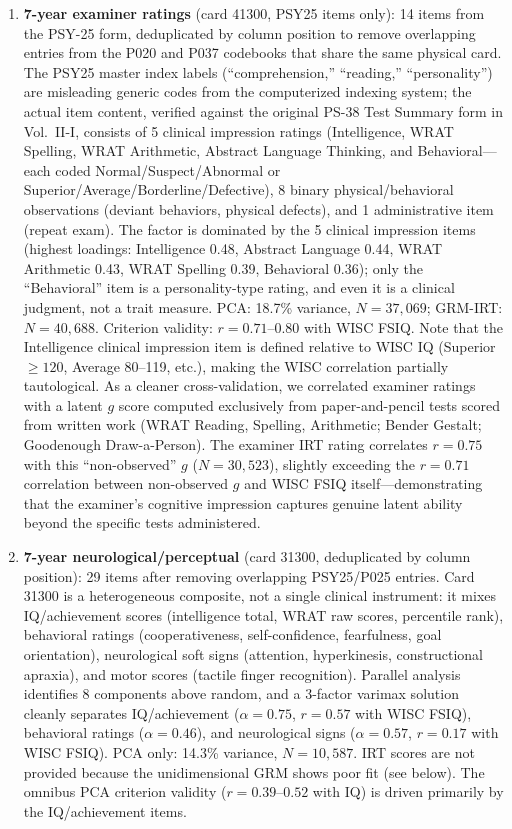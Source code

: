 \documentclass[12pt]{article}
\begin{document}
\begin{enumerate}
\item \textbf{7-year examiner ratings} (card 41300, PSY25 items only): 14 items from the PSY-25 form, deduplicated by column position to remove overlapping entries from the P020 and P037 codebooks that share the same physical card. The PSY25 master index labels (``comprehension,'' ``reading,'' ``personality'') are misleading generic codes from the computerized indexing system; the actual item content, verified against the original PS-38 Test Summary form in Vol.\ II-I, consists of 5 clinical impression ratings (Intelligence, WRAT Spelling, WRAT Arithmetic, Abstract Language Thinking, and Behavioral---each coded Normal/Suspect/Abnormal or Superior/Average/Borderline/Defective), 8 binary physical/behavioral observations (deviant behaviors, physical defects), and 1 administrative item (repeat exam). The factor is dominated by the 5 clinical impression items (highest loadings: Intelligence 0.48, Abstract Language 0.44, WRAT Arithmetic 0.43, WRAT Spelling 0.39, Behavioral 0.36); only the ``Behavioral'' item is a personality-type rating, and even it is a clinical judgment, not a trait measure. PCA: 18.7\% variance, $N = 37{,}069$; GRM-IRT: $N = 40{,}688$. Criterion validity: $r = 0.71$--$0.80$ with WISC FSIQ. Note that the Intelligence clinical impression item is defined relative to WISC IQ (Superior $\geq 120$, Average 80--119, etc.), making the WISC correlation partially tautological. As a cleaner cross-validation, we correlated examiner ratings with a latent $g$ score computed exclusively from paper-and-pencil tests scored from written work (WRAT Reading, Spelling, Arithmetic; Bender Gestalt; Goodenough Draw-a-Person). The examiner IRT rating correlates $r = 0.75$ with this ``non-observed'' $g$ ($N = 30{,}523$), slightly exceeding the $r = 0.71$ correlation between non-observed $g$ and WISC FSIQ itself---demonstrating that the examiner's cognitive impression captures genuine latent ability beyond the specific tests administered.

\item \textbf{7-year neurological/perceptual} (card 31300, deduplicated by column position): 29 items after removing overlapping PSY25/P025 entries. Card 31300 is a heterogeneous composite, not a single clinical instrument: it mixes IQ/achievement scores (intelligence total, WRAT raw scores, percentile rank), behavioral ratings (cooperativeness, self-confidence, fearfulness, goal orientation), neurological soft signs (attention, hyperkinesis, constructional apraxia), and motor scores (tactile finger recognition). Parallel analysis identifies 8 components above random, and a 3-factor varimax solution cleanly separates IQ/achievement ($\alpha = 0.75$, $r = 0.57$ with WISC FSIQ), behavioral ratings ($\alpha = 0.46$), and neurological signs ($\alpha = 0.57$, $r = 0.17$ with WISC FSIQ). PCA only: 14.3\% variance, $N = 10{,}587$. IRT scores are not provided because the unidimensional GRM shows poor fit (see below). The omnibus PCA criterion validity ($r = 0.39$--$0.52$ with IQ) is driven primarily by the IQ/achievement items.


\end{enumerate}
\end{document}
